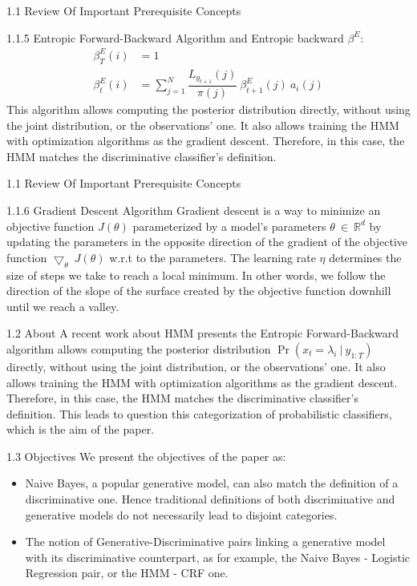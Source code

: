 \documentclass{beamer}
\providecommand{\pr}[1]{\ensuremath{\Pr\left(#1\right)}}
\begin{document}
\begin{frame}{1.1 Review Of Important Prerequisite Concepts}
\begin{block}{1.1.5 Entropic Forward-Backward Algorithm}
and Entropic backward $\beta^{E}$:
\begin{equation}
\begin{split}
    \beta_{T}^{E}(i) &= 1\\
    \beta_{t}^{E}(i) &= \sum_{j=1}^{N}\dfrac{L_{y_{t+1}}(j)}{\pi(j)}\  \beta_{t+1}^{E}(j)\ a_i(j)
\end{split}
\end{equation}
This algorithm allows computing the posterior distribution directly, without using the joint distribution, or the observations’ one. It also allows training the HMM with optimization algorithms as the gradient descent. Therefore, in this case, the HMM matches the discriminative classifier’s definition.
\end{block} 
\end{frame}
\begin{frame}{1.1 Review Of Important Prerequisite Concepts}
\begin{block}{1.1.6 Gradient Descent Algorithm}
Gradient descent is a way to minimize an objective function $J(\theta)$ parameterized by a model's parameters $\theta\ \in\ \mathbb{R}^d$ by updating the parameters in the opposite direction of the gradient of the objective function $\bigtriangledown_\theta\ J(\theta)$ w.r.t to the parameters. The learning rate $\eta$ determines the size of steps we take to reach a local minimum. In other words, we follow the direction of the slope of the surface created by the objective function downhill until we reach a valley.
\end{block}
\end{frame}
\begin{frame}{1.2 About}
    A recent work about HMM presents the Entropic Forward-Backward algorithm allows computing the posterior distribution $\pr{x_t = \lambda_i\ |\ y_{1:T}}$ directly, without using the joint distribution, or the observations’ one. It also allows training the HMM with optimization algorithms as the gradient descent. Therefore, in this case, the
HMM matches the discriminative classifier’s definition. This leads to question this categorization of probabilistic classifiers, which is the aim of the paper. 
\end{frame}
\begin{frame}{1.3 Objectives}
We present the objectives of the paper as:
    \begin{itemize}
        \item Naive Bayes, a popular generative model, can also match the definition of a discriminative one. Hence traditional definitions of both discriminative and generative models do not necessarily lead to disjoint categories.
        \item The notion of Generative-Discriminative pairs linking a  generative model with its discriminative counterpart, as for example, the Naive Bayes - Logistic Regression pair, or the HMM - CRF one.
    \end{itemize}
\end{frame}
\end{document}
